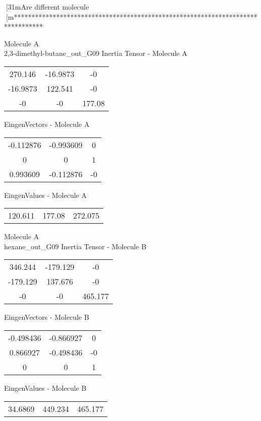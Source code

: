 [31mAre different molecule
[m********************************************************************************
\newpage
\begin{multicols}{2}
\begin{center}
Molecule A \\ 
2,3-dimethyl-butane_out_G09
Inertia Tensor - Molecule A \\
\vtab
\begin{tabular}{|c c c|}
270.146	 & 	-16.9873	 & 	-0	 \\
-16.9873	 & 	122.541	 & 	-0	 \\
-0	 & 	-0	 & 	177.08
\end{tabular}

\vtab
 EingenVectors - Molecule A     \\
\vtab
\begin{tabular}{|c c c|}
-0.112876	 & 	-0.993609	 & 	0	 \\
0	 & 	0	 & 	1	 \\
0.993609	 & 	-0.112876	 & 	-0
\end{tabular}

\vtab
 EingenValues - Molecule A     \\
\vtab
\begin{tabular}{|c c c|}
120.611	 & 	177.08	 & 	272.075
\end{tabular}
\columnbreak
Molecule A \\ 
hexane_out_G09
Inertia Tensor - Molecule B \\
\vtab
\begin{tabular}{|c c c|}
346.244	 & 	-179.129	 & 	-0	 \\
-179.129	 & 	137.676	 & 	-0	 \\
-0	 & 	-0	 & 	465.177
\end{tabular}

\vtab
 EingenVectors - Molecule B     \\
\vtab
\begin{tabular}{|c c c|}
-0.498436	 & 	-0.866927	 & 	0	 \\
0.866927	 & 	-0.498436	 & 	-0	 \\
0	 & 	0	 & 	1
\end{tabular}

\vtab
 EingenValues - Molecule B     \\
\vtab
\begin{tabular}{|c c c|}
34.6869	 & 	449.234	 & 	465.177
\end{tabular}
\end{center}
\end{multicols}
